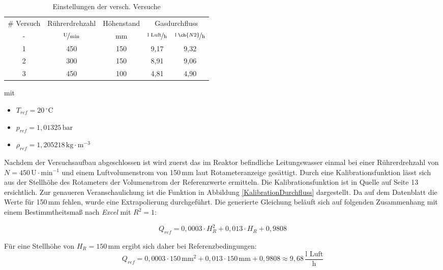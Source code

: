 \documentclass[12pt,liststotoc]{report}
\begin{document}
\begin{table}[H]
\caption{Einstellungen der versch. Versuche}
\centering
\begin{tabular}{ccccc}
\toprule 
$\#$ Versuch&Rührerdrehzahl&Höhenstand &\multicolumn{2}{c}{Gasdurchfluss}\\
-&$\nicefrac{\text{U}}{\min}$&mm&$\nicefrac{\text{l Luft}}{\text{h}}$&$\nicefrac{\text{l}\;\ch{N2}}{\text{h}}$\\
\midrule
1&450&150&9,17&9,32\\
2&300&150&8,91&9,06\\
3&450&100&4,81&4,90\\
\bottomrule
\end{tabular}
\label{Versuche}
\end{table}
\noindent
mit 
\begin{itemize}
    \item $T_{ref} = 20\,^\circ\text{C}$
    \item $p_{ref} = 1,01325\,\text{bar}$
    \item $\rho_{ref} = 1,205218\,\text{kg}\cdot\text{m}^{-3}$
\end{itemize}\label{Referenzparamter}

Nachdem der Versuchsaufbau abgeschlossen ist wird zuerst das im Reaktor befindliche Leitungswasser einmal bei einer Rührerdrehzahl von $N=450\,\text{U} \cdot \text{min}^{-1}$ und einem Luftvolumenstrom von 150\,mm laut Rotameteranzeige gesättigt. Durch eine Kalibrationsfunktion lässt sich aus der Stellhöhe des Rotameters der Volumenstrom der Referenzwerte ermitteln. Die Kalibrationsfunktion ist in Quelle \cite{Labor_Skript} auf Seite 13 ersichtlich. Zur genaueren Veranschaulichung ist die Funktion in Abbildung \ref{KalibrationDurchfluss} dargestellt. Da auf dem Datenblatt die Werte für 150\,mm fehlen, wurde eine Extrapolierung durchgeführt. Die generierte Gleichung beläuft sich auf folgenden Zusammenhang mit einem Bestimmtheitsmaß nach \textit{\textit{Excel}} mit $R^2=1$:

\begin{equation}
    Q_{ref} = 0,0003 \cdot H_{R}^2 + 0,013\cdot H_{R} + 0,9808
\end{equation}

Für eine Stellhöhe von $H_{R} = 150\,\text{mm}$ ergibt sich daher bei Referenzbedingungen:
\begin{equation}
    Q_{ref} = 0,0003 \cdot 150\,\text{mm}^2 + 0,013\cdot 150\,\text{mm} + 0,9808 \approx 9,68\,\frac{\text{l Luft}}{\text{h}}
\end{equation}
\end{document}
